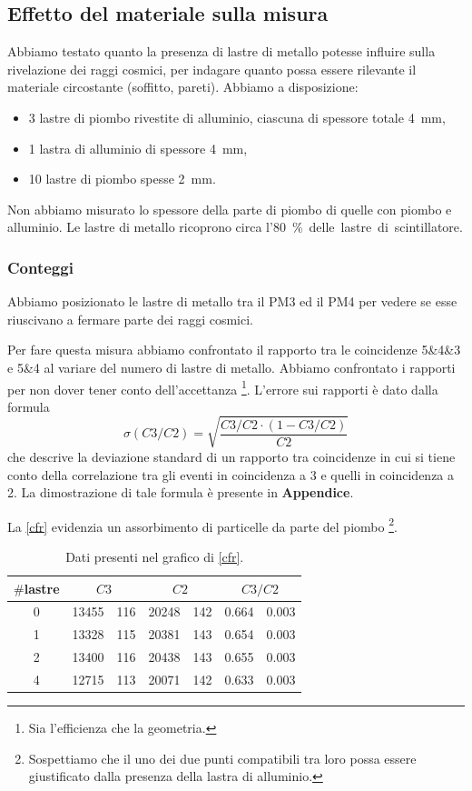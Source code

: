 \subsection{Effetto del materiale sulla misura}

Abbiamo testato quanto la presenza di lastre di metallo potesse influire sulla rivelazione dei raggi cosmici,
per indagare quanto possa essere rilevante il materiale circostante (soffitto, pareti).
Abbiamo a disposizione:
\begin{itemize}
	\item 3 lastre di piombo rivestite di alluminio, ciascuna di spessore totale \SI{4}{mm},
	\item 1 lastra di alluminio di spessore \SI{4}{mm},
	\item 10 lastre di piombo spesse \SI{2}{mm}.
\end{itemize}
Non abbiamo misurato lo spessore della parte di piombo di quelle con piombo e alluminio.
Le lastre di metallo ricoprono circa l'\SI{80}\% delle lastre di scintillatore. 

\subsubsection{Conteggi}

Abbiamo posizionato le lastre di metallo tra il PM3 ed il PM4
per vedere se esse riuscivano a fermare parte dei raggi cosmici.

Per fare questa misura abbiamo confrontato il rapporto tra le coincidenze 5\&4\&3 e 5\&4
al variare del numero di lastre di metallo.
Abbiamo confrontato i rapporti per non dover tener conto dell'accettanza%
\footnote{Sia l'efficienza che la geometria.}.
L'errore sui rapporti è dato dalla formula
$$ \sigma(C3/C2)= \sqrt{ \frac{C3/C2\cdot (1-C3/C2)}{C2} } $$
che descrive la deviazione standard di un rapporto tra coincidenze in cui si tiene conto della correlazione tra gli eventi in coincidenza a 3 e quelli in coincidenza a 2. La dimostrazione di tale formula è presente in \textbf{Appendice}.

La \autoref{cfr} evidenzia un assorbimento di particelle da parte del piombo%
\footnote{Sospettiamo che il uno dei due punti compatibili tra loro possa essere giustificato dalla presenza della lastra di alluminio.}.

\begin{table}
\centering
\begin{tabular}{| c | r @{\,$\pm$\,} l | r @{\,$\pm$\,} l | r @{\,$\pm$\,} l |}
\hline
$\#$lastre & \multicolumn{2}{c|}{$C3$} & \multicolumn{2}{c|}{$C2$} & \multicolumn{2}{c|}{$C3/C2$} \\ 
\hline
0 & 13455&116 & 20248&142 & 0.664&0.003 \\
1 & 13328&115 & 20381&143 & 0.654&0.003 \\
2 & 13400&116 & 20438&143 & 0.655&0.003 \\
4 & 12715&113 & 20071&142 & 0.633&0.003 \\
\hline
\end{tabular}
\caption{Dati presenti nel grafico di \autoref{cfr}.}
\label{dati cfr}
\end{table}


